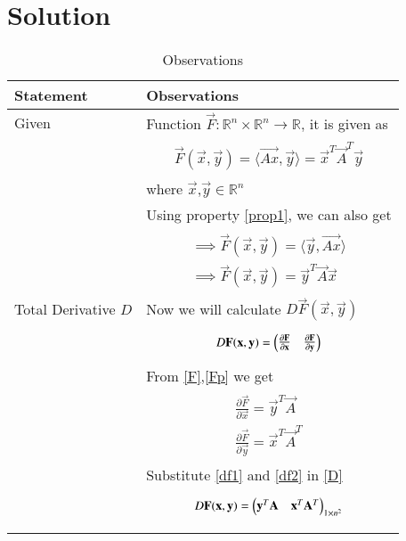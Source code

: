 \documentclass[journal,12pt]{IEEEtran}
\begin{document}
\section{\textbf{Solution}}
\renewcommand{\thetable}{2}
\begin{longtable}{|l|l|}
\hline
\endhead
\textbf{Statement}&\textbf{Observations}\\
\hline
Given&Function $\vec{F}:\mathbb{R}^n\times\mathbb{R}^n\rightarrow\mathbb{R}$, it is given as\\&\parbox{13cm}{\begin{align}
    \vec{F}(\vec{x},\vec{y})=\langle\vec{Ax},\vec{y}\rangle=\vec{x}^T\vec{A}^T\vec{y}\label{F}
\end{align}}\\&where $\vec{x}$,$\vec{y}\in\mathbb{R}^n$\\&Using property \eqref{prop1}, we can also get\\&\parbox{13cm}{\begin{align}
    \implies\vec{F}(\vec{x},\vec{y})=\langle\vec{y},\vec{Ax}\rangle\\
    \implies\vec{F}(\vec{x},\vec{y})=\vec{y}^T\vec{A}\vec{x}\label{Fp}
\end{align}}\\
\hline
Total Derivative $D$&Now we will calculate $D\vec{F}(\vec{x},\vec{y})$\\&\parbox{13cm}{\begin{align}
    D\mathbf{F}(\mathbf{x},\mathbf{y})=\begin{pmatrix}\frac{\partial \mathbf{F}}{\partial \mathbf{x}}&\frac{\partial \mathbf{F}}{\partial \mathbf{y}}\end{pmatrix}\label{D}
\end{align}}\\&From \eqref{F},\eqref{Fp} we get\\&\parbox{13cm}{\begin{align}
    \frac{\partial \vec{F}}{\partial \vec{x}}=\vec{y}^T\vec{A}\label{df1}\\
    \frac{\partial \vec{F}}{\partial \vec{y}}=\vec{x}^T\vec{A}^T\label{df2}
\end{align}}\\&Substitute \eqref{df1} and \eqref{df2} in \eqref{D}\\&\parbox{13cm}{\begin{align}
    D\mathbf{F}(\mathbf{x},\mathbf{y})=\begin{pmatrix}\mathbf{y}^T\mathbf{A}&\mathbf{x}^T\mathbf{A}^T\end{pmatrix}_{1\times n^2}\label{Dsol}
\end{align}}\\
\hline
\caption{Observations}
\label{obs}
\end{longtable}
\renewcommand{\thetable}{3}
\end{document}
